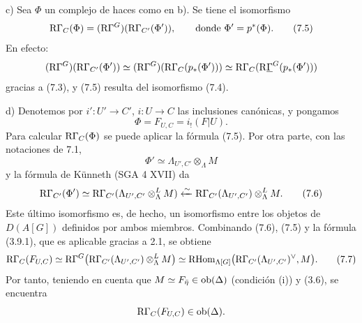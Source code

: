 c) Sea $\Phi$ un complejo de haces como en b). Se tiene el isomorfismo
\[
\mathrm{R}\Gamma_C(\Phi)=(\mathrm{R}\Gamma^G)(\mathrm{R}\Gamma_{C'}(\Phi')),
\qquad\text{donde } \Phi'=p^*(\Phi).
\tag{7.5}
\]
En efecto:
\[
(\mathrm{R}\Gamma^G)(\mathrm{R}\Gamma_{C'}(\Phi'))
\simeq
(\mathrm{R}\Gamma^G)(\mathrm{R}\Gamma_C(p_*(\Phi')))
\simeq
\mathrm{R}\Gamma_C(\mathrm{R}\underline{\Gamma}^G(p_*(\Phi')))
\]
gracias a (7.3), y (7.5) resulta del isomorfismo (7.4).

d) Denotemos por $i':U'\to C'$, $i:U\to C$ las inclusiones canónicas, y pongamos
\[
\Phi=F_{U,C}=i_!(F|U).
\]
Para calcular $\mathrm{R}\Gamma_C(\Phi)$ se puede aplicar la fórmula (7.5). Por otra parte, con las notaciones de 7.1,
\[
\Phi'\simeq \Lambda_{U',C'}\otimes_\Lambda M
\]
y la fórmula de Künneth (SGA 4 XVII) da
\[
\mathrm{R}\Gamma_{C'}(\Phi')
\simeq
\mathrm{R}\Gamma_{C'}(\Lambda_{U',C'}\otimes_\Lambda^L M)
\xleftarrow{\sim}
\mathrm{R}\Gamma_{C'}(\Lambda_{U',C'})\otimes_\Lambda^L M.
\tag{7.6}
\]
Este último isomorfismo es, de hecho, un isomorfismo entre los objetos de $D(A[G])$ definidos por ambos miembros. Combinando (7.6), (7.5) y la fórmula (3.9.1), que es aplicable gracias a 2.1, se obtiene
\[
\mathrm{R}\Gamma_C(F_{U,C})
\simeq
\mathrm{R}\Gamma^G\bigl(\mathrm{R}\Gamma_{C'}(\Lambda_{U',C'})\otimes_\Lambda^L M\bigr)
\simeq
\mathrm{RHom}_{\Lambda[G]}\bigl(\mathrm{R}\Gamma_{C'}(\Lambda_{U',C'})^\vee,M\bigr).
\tag{7.7}
\]
Por tanto, teniendo en cuenta que $M\simeq F_{\bar\eta}\in\operatorname{ob}(\Delta)$ (condición (i)) y (3.6), se encuentra
\[
\mathrm{R}\Gamma_C(F_{U,C})\in\operatorname{ob}(\Delta).
\]

